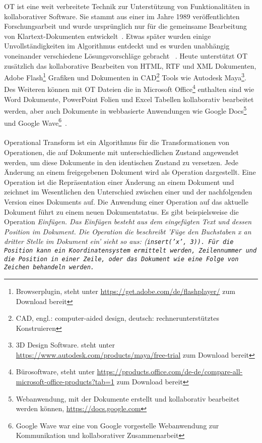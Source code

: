 \gls{OT} ist eine weit verbreitete Technik zur Unterstützung von Funktionalitäten in \gls{kollaborativ}er Software.
Sie stammt aus einer im Jahre 1989 veröffentlichten Forschungsarbeit und wurde ursprünglich nur für die gemeinsame Bearbeitung von Klartext-Dokumenten entwickelt~\cite{ot_paper}. Etwas später wurden einige Unvollständigkeiten im Algorithmus entdeckt und es wurden unabhängig voneinander verschiedene Lösungsvorschläge gebracht ~\cite{ot-later}.
Heute unterstützt \gls{OT} zusätzlich das \gls{kollaborativ}e Bearbeiten von \gls{HTML}, RTF und XML Dokumenten, Adobe Flash\footnote{ Browserplugin, steht unter \url{https://get.adobe.com/de/flashplayer/} zum Download bereit} Grafiken und Dokumenten in CAD\footnote{ CAD, engl.: computer-aided design, deutsch: rechnerunterstütztes Konstruieren} Tools wie Autodesk Maya\footnote{ 3D Design Software. steht unter \url{https://www.autodesk.com/products/maya/free-trial} zum Download bereit}.
Des Weiteren können mit \gls{OT} Dateien die in Microsoft Office\footnote{ Bürosoftware, steht unter \url{https://products.office.com/de-de/compare-all-microsoft-office-products?tab=1} zum Download bereit} enthalten sind wie Word Dokumente, PowerPoint Folien und Excel Tabellen kollaborativ bearbeitet werden, aber auch Dokumente in webbasierte Anwendungen wie Google Docs\footnote{ Webanwendung, mit der Dokumente erstellt und kollaborativ bearbeitet werden können, \url{https://docs.google.com}} und Google Wave\footnote{ Google Wave war eine von Google vorgestelle Webanwendung zur Kommunikation und kollaborativer Zusammenarbeit}~\cite{ot-faq}.\\\\
%
%
Operational Transform ist ein Algorithmus für die Transformationen von Operationen, die auf Dokumente mit unterschiedlichen Zustand angewendet werden, um diese Dokumente in den identischen Zustand zu versetzen.
Jede Änderung an einem freigegebenen Dokument wird als Operation dargestellt.
Eine Operation ist die Repräsentation einer Änderung an einem Dokument und zeichnet im Wesentlichen den Unterschied zwischen einer und der nachfolgenden Version eines Dokuments auf.
Die Anwendung einer Operation auf das aktuelle Dokument führt zu einem neuen Dokumentstatus.
Es gibt beispielsweise die Operation \it{Einfügen}. 
Das Einfügen besteht aus dem eingefügten Text und dessen Position im Dokument. Die Operation die beschreibt 'Füge den Buchstaben x an dritter Stelle im Dokument ein' sieht so aus: (\tt{insert('x', 3)}).
Für die Position kann ein Koordinatensystem ermittelt werden, Zeilennummer und die Position in einer Zeile, oder das Dokument wie eine Folge von Zeichen behandeln werden.\\
